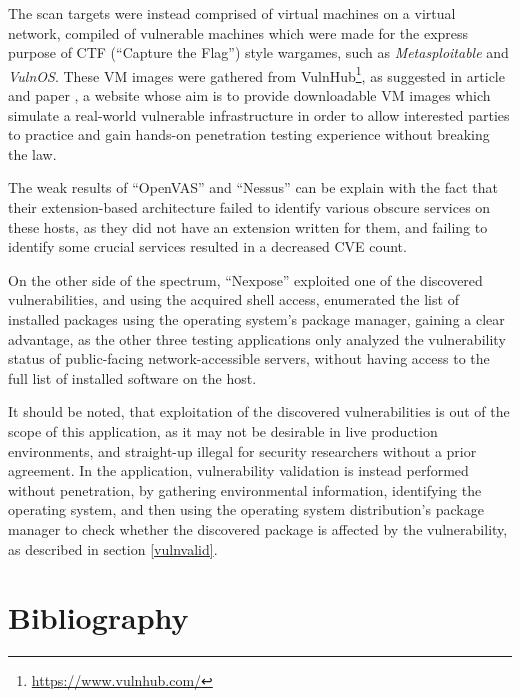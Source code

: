 \documentclass[a4paper,12pt]{article}
\begin{document}
	The scan targets were instead comprised of virtual machines on a virtual network, compiled of vulnerable machines which were made for the express purpose of CTF (``Capture the Flag'') style wargames, such as \textit{Metasploitable} and \textit{VulnOS}. These VM images were gathered from VulnHub\footnote{\url{https://www.vulnhub.com/}}, as suggested in article \cite{penintro15} and paper \cite{secgen15}, a website whose aim is to provide downloadable VM images which simulate a real-world vulnerable infrastructure in order to allow interested parties to practice and gain hands-on penetration testing experience without breaking the law.
	
	The weak results of ``OpenVAS'' and ``Nessus'' can be explain with the fact that their extension-based architecture failed to identify various obscure services on these hosts, as they did not have an extension written for them, and failing to identify some crucial services resulted in a decreased CVE count.
	
	On the other side of the spectrum, ``Nexpose'' exploited one of the discovered vulnerabilities, and using the acquired shell access, enumerated the list of installed packages using the operating system's package manager, gaining a clear advantage, as the other three testing applications only analyzed the vulnerability status of public-facing network-accessible servers, without having access to the full list of installed software on the host.
	
	It should be noted, that exploitation of the discovered vulnerabilities is out of the scope of this application, as it may not be desirable in live production environments, and straight-up illegal for security researchers without a prior agreement. In the application, vulnerability validation is instead performed without penetration, by gathering environmental information, identifying the operating system, and then using the operating system distribution's package manager to check whether the discovered package is affected by the vulnerability, as described in section \ref{vulnvalid}.

\newpage
\section{Bibliography}
 

	\begingroup
	\renewcommand{\section}[2]{}
	\renewcommand{\markboth}[2]{}
		
		
	\endgroup
\end{document}
